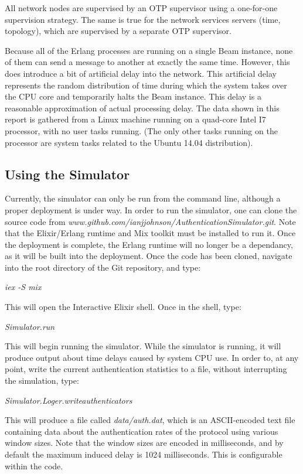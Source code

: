 \documentclass[12pt]{article}
\begin{document}
All network nodes are supervised by an OTP supervisor using a one-for-one supervision strategy. The same is true for the network services servers (time, topology), which are supervised by a separate OTP supervisor.

Because all of the Erlang processes are running on a single Beam instance, none of them can send a message to another at exactly the same time. However, this does introduce a bit of artificial delay into the network. This artificial delay represents the random distribution of time during which the system takes over the CPU core and temporarily halts the Beam instance. This delay is a reasonable approximation of actual processing delay. The data shown in this report is gathered from a Linux machine running on a quad-core Intel I7 processor, with no user tasks running. (The only other tasks running on the processor are system tasks related to the Ubuntu 14.04 distribution).


\subsection{Using the Simulator}

Currently, the simulator can only be run from the command line, although a proper deployment is under way. In order to run the simulator, one can clone the source code from \textit{www.github.com/ianjjohnson/AuthenticationSimulator.git}. Note that the Elixir/Erlang runtime and Mix toolkit must be installed to run it. Once the deployment is complete, the Erlang runtime will no longer be a dependancy, as it will be built into the deployment. Once the code has been cloned, navigate into the root directory of the Git repository, and type:

\textit{iex -S mix}

This will open the Interactive Elixir shell. Once in the shell, type:

\textit{Simulator.run}

This will begin running the simulator. While the simulator is running, it will produce output about time delays caused by system CPU use. In order to, at any point, write the current authentication statistics to a file, without interrupting the simulation, type:

\textit{Simulator.Loger.write\textunderscore authenticators}

This will produce a file called \textit{data/auth.dat}, which is an ASCII-encoded text file containing data about the authentication rates of the protocol using various window sizes. Note that the window sizes are encoded in milliseconds, and by default the maximum induced delay is 1024 milliseconds. This is configurable within the code.
\end{document}
